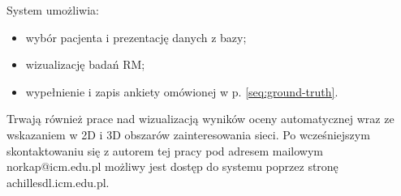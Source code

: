 System umożliwia:
\begin{itemize}[noitemsep,nolistsep]
	\item wybór pacjenta i prezentację danych z bazy;
	\item wizualizację badań RM;
	\item wypełnienie i zapis ankiety omówionej w p. \ref{seq:ground-truth}.
\end{itemize}

Trwają również prace nad wizualizacją wyników oceny automatycznej wraz \linebreak ze wskazaniem w 2D i 3D obszarów zainteresowania sieci. Po wcześniejszym skontaktowaniu się z autorem tej pracy pod adresem mailowym norkap@icm.edu.pl możliwy jest dostęp do systemu poprzez stronę achillesdl.icm.edu.pl.